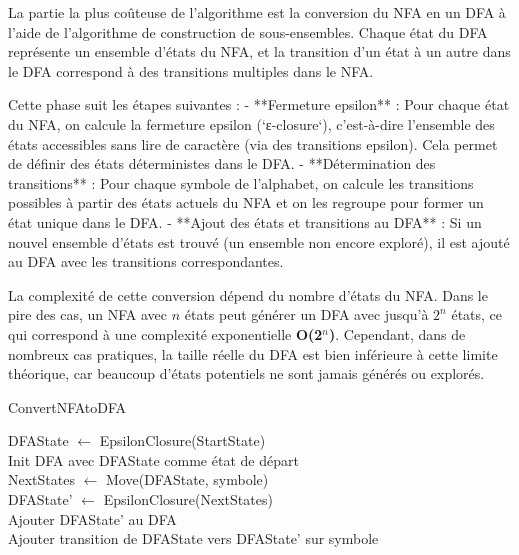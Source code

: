 \documentclass[11pt,english]{article}
\begin{document}
La partie la plus coûteuse de l'algorithme est la conversion du NFA en un DFA à l'aide de l'algorithme de construction de sous-ensembles. Chaque état du DFA représente un ensemble d'états du NFA, et la transition d'un état à un autre dans le DFA correspond à des transitions multiples dans le NFA.

Cette phase suit les étapes suivantes :
- **Fermeture epsilon** : Pour chaque état du NFA, on calcule la fermeture epsilon (`ε-closure`), c'est-à-dire l'ensemble des états accessibles sans lire de caractère (via des transitions epsilon). Cela permet de définir des états déterministes dans le DFA.
- **Détermination des transitions** : Pour chaque symbole de l'alphabet, on calcule les transitions possibles à partir des états actuels du NFA et on les regroupe pour former un état unique dans le DFA.
- **Ajout des états et transitions au DFA** : Si un nouvel ensemble d'états est trouvé (un ensemble non encore exploré), il est ajouté au DFA avec les transitions correspondantes.

La complexité de cette conversion dépend du nombre d'états du NFA. Dans le pire des cas, un NFA avec $n$ états peut générer un DFA avec jusqu'à $2^n$ états, ce qui correspond à une complexité exponentielle \textbf{O(2$^n$)}. Cependant, dans de nombreux cas pratiques, la taille réelle du DFA est bien inférieure à cette limite théorique, car beaucoup d'états potentiels ne sont jamais générés ou explorés.

\begin{algorithm}[htbp]
    \SetAlFnt{\footnotesize\sf}

    \caption{ConvertNFAtoDFA}
    
    \Begin
    {
        DFAState $\leftarrow$ EpsilonClosure(StartState) \\
        Init DFA avec DFAState comme état de départ \\
        
        {
            {
                NextStates $\leftarrow$ Move(DFAState, symbole) \\
                DFAState' $\leftarrow$ EpsilonClosure(NextStates) \\
                
                {
                    Ajouter DFAState' au DFA \\
                }
                Ajouter transition de DFAState vers DFAState' sur symbole \\
            }
        }
    }
\end{algorithm}
\end{document}
